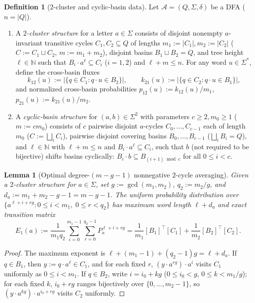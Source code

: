 \documentclass[11pt,a4paper]{article}
\newtheorem{lemma}[theorem]{Lemma}
\theoremstyle{definition}
\newtheorem{definition}[theorem]{Definition}
\theoremstyle{remark}
\newcommand{\N}{\mathbb{N}}
\newcommand{\cA}{\mathcal{A}}
\newcommand{\ind}[1]{[#1]}
\begin{document}
\begin{definition}[$2$-cluster and cyclic-basin data]
\label{def:twocluster}
Let $\cA = (Q, \Sigma, \delta)$ be a DFA ($n = |Q|$).
\begin{enumerate}[label=(\arabic*),nosep]
  \item A \emph{$2$-cluster structure} for a letter $a \in \Sigma$ consists of disjoint nonempty $a$-invariant transitive cycles $C_1, C_2 \subseteq Q$ of lengths $m_1 := |C_1|, m_2 := |C_2|$ ($C := C_1 \sqcup C_2$, $m := m_1 + m_2$), disjoint basins $B_1 \sqcup B_2 = Q$, and tree height $\ell \in \N$ such that $B_i \cdot a^\ell \subseteq C_i$ ($i = 1, 2$) and $\ell + m \le n$. For any word $u \in \Sigma^*$, define the cross-basin fluxes
  \[
    k_{12}(u) := |\{q \in C_1 : q \cdot u \in B_2\}|, \qquad k_{21}(u) := |\{q \in C_2 : q \cdot u \in B_1\}|,
  \]
  and normalized cross-basin probabilities $p_{12}(u) := k_{12}(u)/m_1$, $p_{21}(u) := k_{21}(u)/m_2$.
  \item A \emph{cyclic-basin structure} for $(a, b) \in \Sigma^2$ with parameters $c \ge 2, m_0 \ge 1$ ($m := c m_0$) consists of $c$ pairwise disjoint $a$-cycles $C_0, \dots, C_{c-1}$ each of length $m_0$ ($C := \bigsqcup_i C_i$), pairwise disjoint covering basins $B_0, \dots, B_{c-1}$ ($\bigsqcup_i B_i = Q$), and $\ell \in \N$ with $\ell + m \le n$ and $B_i \cdot a^\ell \subseteq C_i$, such that $b$ (not required to be bijective) shifts basins cyclically: $B_i \cdot b \subseteq B_{(i+1)\bmod c}$ for all $0 \le i < c$.
\end{enumerate}
\end{definition}

\begin{lemma}[Optimal degree-$(m-g-1)$ nonnegative $2$-cycle averaging]
\label{lem:opt-avg}
Given a $2$-cluster structure for $a \in \Sigma$, set $g := \gcd(m_1, m_2)$, $q_2 := m_2 / g$, and $d_a := m_1 + m_2 - g - 1 = m - g - 1$. The uniform probability distribution over $\{a^{\ell + i + r g} : 0 \le i < m_1,\; 0 \le r < q_2\}$ has maximum word length $\ell + d_a$ and exact transition matrix
\[
  E_1(a) := \frac{1}{m_1 q_2} \sum_{i=0}^{m_1 - 1} \sum_{r=0}^{q_2 - 1} P_a^{\ell + i + r g} = \frac{1}{m_1}\ind{B_1}^\top \ind{C_1} + \frac{1}{m_2}\ind{B_2}^\top \ind{C_2}.
\]
\end{lemma}
\begin{proof}
The maximum exponent is $\ell + (m_1 - 1) + (q_2 - 1)g = \ell + d_a$. If $q \in B_1$, then $y := q \cdot a^\ell \in C_1$, and for each fixed $r$, $(y \cdot a^{rg}) \cdot a^i$ visits $C_1$ uniformly as $0 \le i < m_1$. If $q \in B_2$, write $i = i_0 + k g$ ($0 \le i_0 < g$, $0 \le k < m_1/g$); for each fixed $k$, $i_0 + r g$ ranges bijectively over $\{0, \dots, m_2 - 1\}$, so $(y \cdot a^{kg}) \cdot a^{i_0 + rg}$ visits $C_2$ uniformly.
\end{proof}
\end{document}
